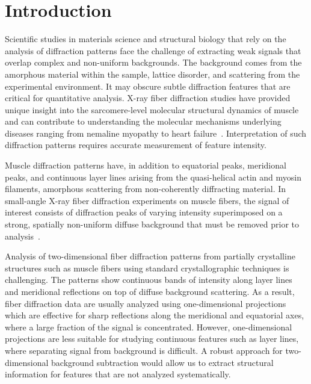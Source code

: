 \documentclass[journal,article,submit,moreauthors]{Definitions/mdpi}
\begin{document}
\section{Introduction} 
\label{sec:introduction}

Scientific studies in materials science and structural biology that rely on the analysis of diffraction patterns face the challenge of extracting weak signals that overlap complex and non-uniform backgrounds. The background comes from the amorphous material within the sample, lattice disorder, and scattering from the experimental environment. It may obscure subtle diffraction features that are critical for quantitative analysis. X-ray fiber diffraction studies have provided unique insight into the sarcomere-level molecular structural dynamics of muscle and can contribute to understanding the molecular mechanisms underlying diseases ranging from nemaline myopathy to heart failure~\citep{MaIrving2022}. Interpretation of such diffraction patterns requires accurate measurement of feature intensity.

Muscle diffraction patterns have, in addition to equatorial peaks, meridional peaks, and continuous layer lines arising from the quasi-helical actin and myosin filaments, amorphous scattering from non-coherently diffracting material. In small-angle X-ray fiber diffraction experiments on muscle fibers, the signal of interest consists of diffraction peaks of varying intensity superimposed on a strong, spatially non-uniform diffuse background that must be removed prior to analysis~\citep{squire2003ccp13_software}.

Analysis of two-dimensional fiber diffraction patterns from partially crystalline structures such as muscle fibers using standard crystallographic techniques is challenging. The patterns show continuous bands of intensity along layer lines and meridional reflections on top of diffuse background scattering. As a result, fiber diffraction data are usually analyzed using one-dimensional projections which are effective for sharp reflections along the meridional and equatorial axes, where a large fraction of the signal is concentrated. However, one-dimensional projections are less suitable for studying continuous features such as layer lines, where separating signal from background is difficult. A robust approach for two-dimensional background subtraction would allow us to extract structural information for features that are not analyzed systematically.
\end{document}
